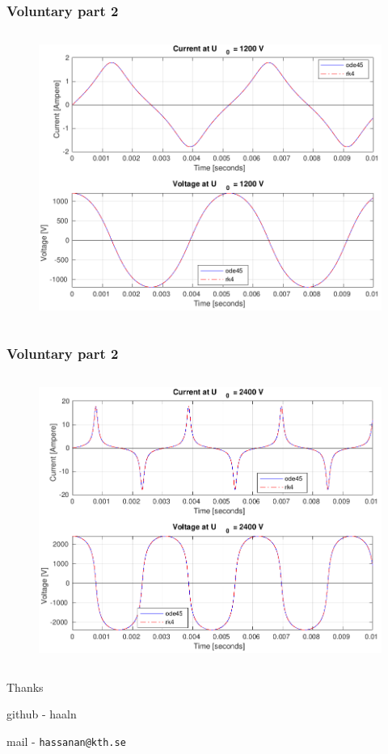 \documentclass[aspectratio=1610]{beamer}
\begin{document}
\begin{frame}
\frametitle{Voluntary part 2}
	\begin{columns}
			\begin{figure}
				\includegraphics[scale=0.27]{figs/voluntary_2_1200.png}
			\end{figure}
	\end{columns}
\end{frame}
\begin{frame}
\frametitle{Voluntary part 2}
	\begin{columns}
		\column{1\textwidth}
			\begin{figure}
				\includegraphics[scale=0.27]{figs/voluntary_2_2400V.png}
			\end{figure}
	\end{columns}
\end{frame}

\begin{frame}
\Large{\centerline{Thanks}}

\vspace{0.25\textheight}

\small{{github - haaln}}\\ \*

\small{{mail - \tt hassanan@kth.se}}
\end{frame}
\end{document}
